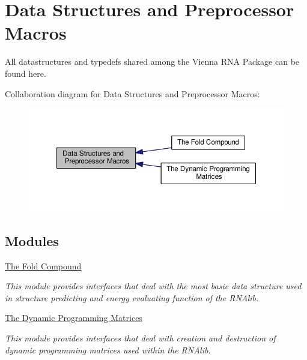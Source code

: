 \hypertarget{group__data__structures}{\section{Data Structures and Preprocessor Macros}
\label{group__data__structures}
}


All datastructures and typedefs shared among the Vienna R\-N\-A Package can be found here.  


Collaboration diagram for Data Structures and Preprocessor Macros\-:
\nopagebreak
\begin{figure}[H]
\begin{center}
\leavevmode
\includegraphics[width=350pt]{group__data__structures}
\end{center}
\end{figure}
\subsection*{Modules}
\begin{DoxyCompactItemize}
\item 
\hyperlink{group__fold__compound}{The Fold Compound}
\begin{DoxyCompactList}\small\item\em This module provides interfaces that deal with the most basic data structure used in structure predicting and energy evaluating function of the R\-N\-Alib. \end{DoxyCompactList}\item 
\hyperlink{group__dp__matrices}{The Dynamic Programming Matrices}
\begin{DoxyCompactList}\small\item\em This module provides interfaces that deal with creation and destruction of dynamic programming matrices used within the R\-N\-Alib. \end{DoxyCompactList}\end{DoxyCompactItemize}
